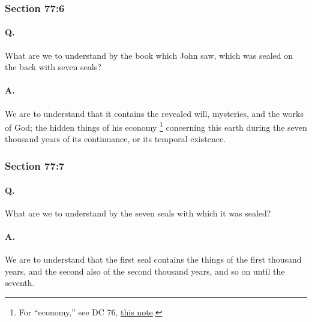 	\subsubsection{Section 77:6} %
		\label{DC77-6}

		\paragraph{Q.}

			What are we to understand by the book which John saw, which was sealed on the back with seven seals?

		\paragraph{A.}
		
			We are to understand that it contains the revealed will, mysteries, and the works of God; the hidden things of his economy%
				\footnote{%
					For ``economy,'' see DC 76, \hyperref[DC76-1-economy]{this note}.
					}
			concerning this earth during the seven thousand years of its continuance, or its temporal existence.


	\subsubsection{Section 77:7} %
		\label{DC77-7}

		\paragraph{Q.}

			What are we to understand by the seven seals with which it was sealed?

		\paragraph{A.}
		
			We are to understand that the first seal contains the things of the first thousand years, and the second also of the second thousand years, and so on until the seventh.

